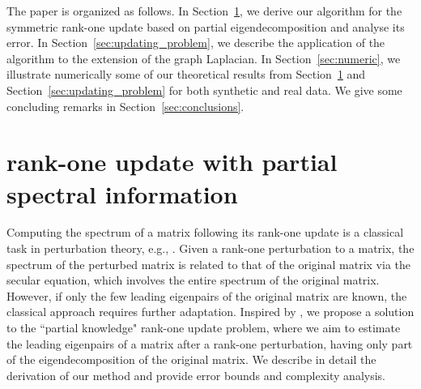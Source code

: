 \documentclass[11pt]{article}
\begin{document}
The paper is organized as follows. In Section~\ref{sec:rank_one_update}, we derive our algorithm for the symmetric rank-one update based on partial eigendecomposition and analyse its error. In Section~\ref{sec:updating_problem}, we describe the application of the algorithm to the extension of the graph Laplacian. In Section~\ref{sec:numeric}, we illustrate numerically some of our theoretical results from Section~\ref{sec:rank_one_update} and Section~\ref{sec:updating_problem} for both synthetic and real data. We give some concluding remarks in Section~\ref{sec:conclusions}.

\section{rank-one update with partial spectral information}  \label{sec:rank_one_update}

Computing the spectrum of a matrix following its rank-one update is a classical task in perturbation theory, e.g., \cite[Chapter 7]{bender2013advanced}. Given a rank-one perturbation to a matrix, the spectrum of the perturbed matrix is related to that of the original matrix via the secular equation, which involves the entire spectrum of the original matrix. However, if only the few leading eigenpairs of the original matrix are known, the classical approach requires further adaptation. Inspired by \cite{bunch1978rank}, we propose a solution to the ``partial knowledge" rank-one update problem, where we aim to estimate the leading eigenpairs of a matrix after a rank-one perturbation, having only part of the eigendecomposition of the original matrix. We describe in detail the derivation of our method and provide error bounds and complexity analysis. 

\end{document}
